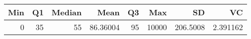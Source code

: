 
\begin{tabular}[t]{rrrrrrrr}
\toprule
Min & Q1 & Median & Mean & Q3 & Max & SD & VC\\
\midrule
0 & 35 & 55 & 86.36004 & 95 & 10000 & 206.5008 & 2.391162\\
\bottomrule
\end{tabular}